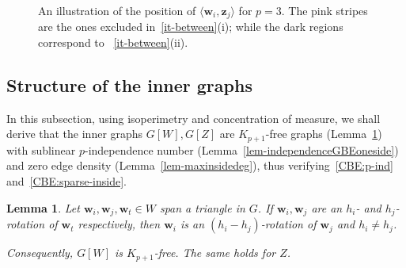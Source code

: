 \documentclass[10pt,a4paper]{article}
\newcommand\innerp[1]{\langle #1 \rangle}
\newcommand{\V}[1]{\mathbold{#1}}
\newtheorem{lemma}[theorem]{Lemma}
\theoremstyle{definition}
\begin{document}
\begin{figure}[h]
{
}
		\caption{An illustration of the position of $\innerp{\V{w}_i,\V{z}_j}$ for $p=3$. The pink stripes are the ones excluded in~\ref{it-between}(i); while the dark regions correspond to ~\ref{it-between}(ii).\label{fig:GBE}}
\end{figure}





\subsection{Structure of the inner graphs}
In this subsection, using isoperimetry and concentration of measure, we shall derive that the inner graphs $G[W], G[Z]$ are $K_{p+1}$-free graphs (Lemma~\ref{obs-samerotation}) with sublinear $p$-independence number (Lemma~\ref{lem-independenceGBEoneside}) and zero edge density (Lemma~\ref{lem-maxinsidedeg}), thus verifying~\ref{CBE:p-ind} and~\ref{CBE:sparse-inside}.


\begin{lemma}\label{obs-samerotation}
	Let $\V{w}_i,\V{w}_{j},\V{w}_{t}\in W$ span a triangle in $G$. If $\V{w}_i, \V{w}_{j}$ are an $h_i$- and $h_j$-rotation of $\V{w}_{t}$ respectively, then $\V{w}_i$ is an $(h_i-h_j)$-rotation of $\V{w}_{j}$ and $h_i\neq h_j$. 
	
	Consequently, $G[W]$ is $K_{ p+1}$-free. The same holds for $Z$.
\end{lemma}
\end{document}
